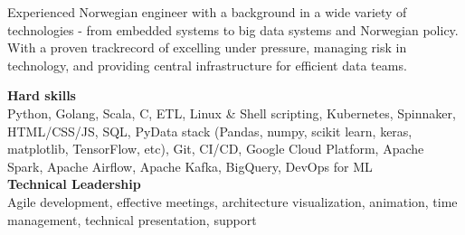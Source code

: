 \documentclass[9pt]{developercv} %
\begin{document}
\vspace{0.2cm}


\begin{minipage}[t]{0.4\textwidth} %
  Experienced Norwegian engineer with a background in a wide variety of technologies - from
  embedded systems to big data systems and Norwegian policy.  With a proven
  trackrecord of excelling under pressure, managing risk in technology, and 
  providing central infrastructure for efficient data teams.
\end{minipage}
\hfill %
\begin{minipage}[t]{0.5\textwidth} %
  \textbf{Hard skills}\\
  Python, Golang, Scala, C, ETL, Linux \& Shell scripting, Kubernetes, Spinnaker, HTML/CSS/JS, SQL, PyData stack (Pandas, numpy, scikit learn, keras, matplotlib, TensorFlow, etc), Git, CI/CD, Google Cloud Platform, Apache Spark, Apache Airflow, Apache Kafka, BigQuery, DevOps for ML
  \\\textbf{Technical Leadership}\\
  Agile development, effective meetings, architecture visualization, animation, time management, technical presentation, support

\end{minipage}



\end{document}
